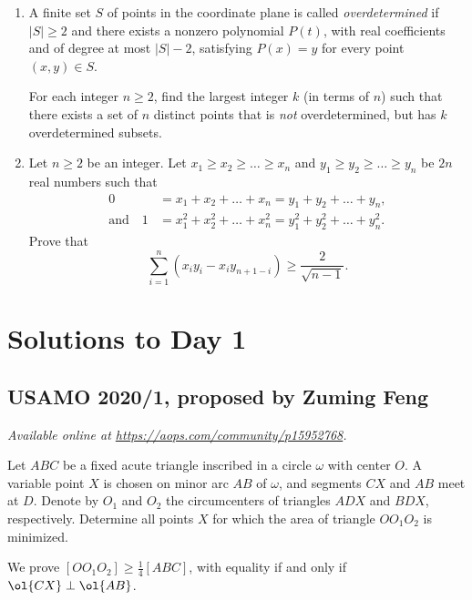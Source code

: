 \documentclass[11pt]{scrartcl}
\begin{document}
\begin{enumerate}[\bfseries 1.]
\item %
A finite set $S$ of points in the coordinate plane
is called \emph{overdetermined} if $|S| \ge 2$
and there exists a nonzero polynomial $P(t)$,
with real coefficients and of degree at most $|S|-2$,
satisfying $P(x)=y$ for every point $(x,y) \in S$.

For each integer $n \ge 2$,
find the largest integer $k$ (in terms of $n$) such that
there exists a set of $n$ distinct points
that is \emph{not} overdetermined,
but has $k$ overdetermined subsets.

\item %
Let $n \geq 2$ be an integer.
Let $x_1 \ge x_2 \ge \dots \ge x_n$
and $y_1 \ge y_2 \ge \dots \ge y_n$ be $2n$ real numbers
such that
\begin{align*}
  0 &= x_1 + x_2 + \dots + x_n = y_1 + y_2 + \dots + y_n, \\
  \text{and}\quad
  1 &= x_1^2 + x_2^2 + \dots + x_n^2 = y_1^2 + y_2^2 + \dots + y_n^2.
\end{align*}
Prove that
\[ \sum_{i=1}^n (x_i y_i - x_i y_{n+1-i})
  \geq \frac{2}{\sqrt{n-1}}.  \]

\end{enumerate}
\pagebreak

\section{Solutions to Day 1}
\subsection{USAMO 2020/1, proposed by Zuming Feng}
\textsl{Available online at \url{https://aops.com/community/p15952768}.}
\begin{mdframed}[style=mdpurplebox,frametitle={Problem statement}]
Let $ABC$ be a fixed acute triangle
inscribed in a circle $\omega$ with center $O$.
A variable point $X$ is chosen on minor arc $AB$ of $\omega$,
and segments $CX$ and $AB$ meet at $D$.
Denote by $O_1$ and $O_2$ the circumcenters of
triangles $ADX$ and $BDX$, respectively.
Determine all points $X$ for which
the area of triangle $OO_1O_2$ is minimized.
\end{mdframed}
We prove $[OO_1O_2] \ge \frac14 [ABC]$,
with equality if and only if $\ol{CX} \perp \ol{AB}$.
\end{document}
